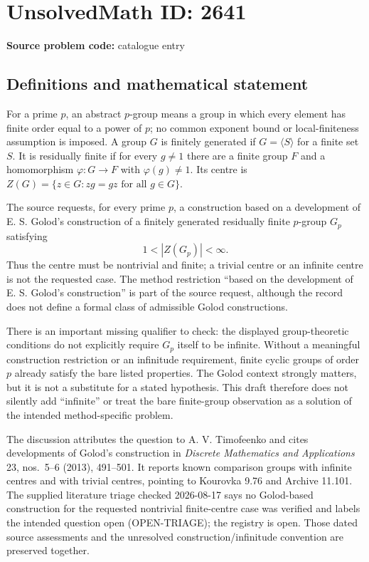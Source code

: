 \documentclass[11pt]{article}
\begin{document}
\section*{UnsolvedMath ID: 2641}
\textbf{Source problem code:} catalogue entry
\subsection{Definitions and mathematical statement}
For a prime $p$, an abstract $p$-group means a group in which every element has finite order equal to a power of $p$; no common exponent bound or local-finiteness assumption is imposed. A group $G$ is finitely generated if $G=\langle S\rangle$ for a finite set $S$. It is residually finite if for every $g\ne1$ there are a finite group $F$ and a homomorphism $\varphi:G\to F$ with $\varphi(g)\ne1$. Its centre is $Z(G)=\{z\in G:zg=gz\text{ for all }g\in G\}$.

The source requests, for every prime $p$, a construction based on a development of E. S. Golod's construction of a finitely generated residually finite $p$-group $G_p$ satisfying
\[1<|Z(G_p)|<\infty.\]
Thus the centre must be nontrivial and finite; a trivial centre or an infinite centre is not the requested case. The method restriction ``based on the development of E. S. Golod's construction'' is part of the source request, although the record does not define a formal class of admissible Golod constructions.

There is an important missing qualifier to check: the displayed group-theoretic conditions do not explicitly require $G_p$ itself to be infinite. Without a meaningful construction restriction or an infinitude requirement, finite cyclic groups of order $p$ already satisfy the bare listed properties. The Golod context strongly matters, but it is not a substitute for a stated hypothesis. This draft therefore does not silently add ``infinite'' or treat the bare finite-group observation as a solution of the intended method-specific problem.

The discussion attributes the question to A. V. Timofeenko and cites developments of Golod's construction in \emph{Discrete Mathematics and Applications} 23, nos.~5--6 (2013), 491--501. It reports known comparison groups with infinite centres and with trivial centres, pointing to Kourovka 9.76 and Archive 11.101. The supplied literature triage checked 2026-08-17 says no Golod-based construction for the requested nontrivial finite-centre case was verified and labels the intended question open (OPEN-TRIAGE); the registry is open. Those dated source assessments and the unresolved construction/infinitude convention are preserved together.
\end{document}
